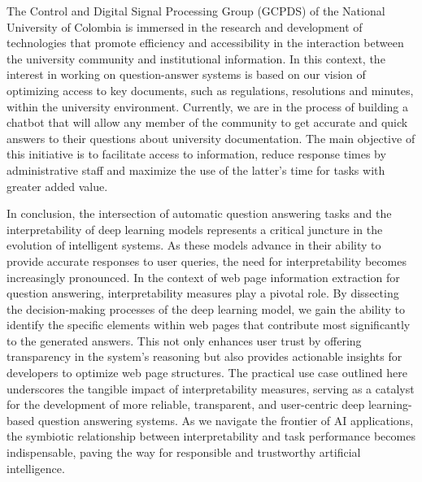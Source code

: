 \newpage

The Control and Digital Signal Processing Group (GCPDS) of the National University of Colombia is immersed in the research and development of technologies that promote efficiency and accessibility in the interaction between the university community and institutional information. In this context, the interest in working on question-answer systems is based on our vision of optimizing access to key documents, such as regulations, resolutions and minutes, within the university environment. Currently, we are in the process of building a chatbot that will allow any member of the community to get accurate and quick answers to their questions about university documentation. The main objective of this initiative is to facilitate access to information, reduce response times by administrative staff and maximize the use of the latter's time for tasks with greater added value.

In conclusion, the intersection of automatic question answering tasks and the interpretability of deep learning models represents a critical juncture in the evolution of intelligent systems. As these models advance in their ability to provide accurate responses to user queries, the need for interpretability becomes increasingly pronounced. In the context of web page information extraction for question answering, interpretability measures play a pivotal role. By dissecting the decision-making processes of the deep learning model, we gain the ability to identify the specific elements within web pages that contribute most significantly to the generated answers. This not only enhances user trust by offering transparency in the system's reasoning but also provides actionable insights for developers to optimize web page structures. The practical use case outlined here underscores the tangible impact of interpretability measures, serving as a catalyst for the development of more reliable, transparent, and user-centric deep learning-based question answering systems. As we navigate the frontier of AI applications, the symbiotic relationship between interpretability and task performance becomes indispensable, paving the way for responsible and trustworthy artificial intelligence.

